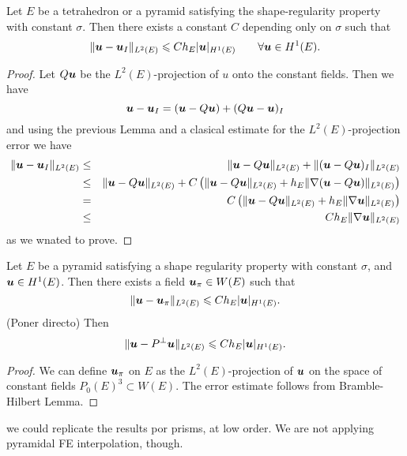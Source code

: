\begin{proposition}\label{propErrorInterpolacionPiramidesTetraedros}
Let $E$ be a tetrahedron or a pyramid satisfying the shape-regularity property with constant $\sigma$. Then there exists a constant $C$ depending only on $\sigma$ such that 
\[
\|\boldsymbol{u}-\boldsymbol{u}_I\|_{L^2(E)}\leqslant C h_E|\boldsymbol{u}|_{H^1(E)} \qquad \forall \boldsymbol{u}\in H^1(E).
\]
\end{proposition}
\begin{proof} Let $Q\boldsymbol{u}$ be the $L^2(E)$-projection of $u$ onto the constant fields. Then we have
\[
\boldsymbol{u}-\boldsymbol{u}_I = (\boldsymbol{u} - Q\boldsymbol{u}) + (Q\boldsymbol{u}-\boldsymbol{u})_I
\]
and using the previous Lemma and a clasical estimate for the $L^2(E)$-projection error we have
\begin{eqnarray*}
\|\boldsymbol{u}-\boldsymbol{u}_I\|_{L^2(E)} &\le& \|\boldsymbol{u} - Q\boldsymbol{u}\|_{L^2(E)} + \|(\boldsymbol{u}-Q\boldsymbol{u})_I\|_{L^2(E)}\\ &\le& \|\boldsymbol{u} - Q\boldsymbol{u}\|_{L^2(E)} + C \left(\|\boldsymbol{u}-Q\boldsymbol{u}\|_{L^2(E)} + h_E\|\nabla(\boldsymbol{u}-Q\boldsymbol{u})\|_{L^2(E)}\right)\\ &=& C\left(\|\boldsymbol{u}-Q\boldsymbol{u}\|_{L^2(E)} + h_E\|\nabla\boldsymbol{u}\|_{L^2(E)}\right)\\&\le& Ch_E\|\nabla\boldsymbol{u}\|_{L^2(E)}
\end{eqnarray*}
as we wnated to prove.
\end{proof}


\begin{proposition}\label{propupi}
Let $E$ be a pyramid satisfying a shape regularity property with constant $\sigma$, and $\boldsymbol{u}\in H^1(E)$. 
Then there exists a field $\boldsymbol{u}_\pi\in W(E)$ such that
\[
\|\boldsymbol{u}-\boldsymbol{u}_\pi\|_{L^2(E)}\leqslant C h_E|\boldsymbol{u}|_{H^1(E)}.
\]
(Poner directo) Then
\[
\|\boldsymbol{u}-P^{\perp}\boldsymbol{u}\|_{L^2(E)}\leqslant C h_E|\boldsymbol{u}|_{H^1(E)}.
\]
\end{proposition}
\begin{proof}
We can define $\boldsymbol{u}_\pi$ on $E$ as the $L^2(E)$-projection of $\boldsymbol{u}$ on the space
of constant fields $P_0(E)^3\subset W(E)$. The error estimate follows from Bramble-Hilbert Lemma.  
\end{proof}
\begin{remark}
  we could replicate the results por prisms, at low order. We are not
  applying pyramidal FE interpolation, though.
\end{remark}